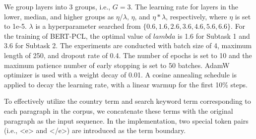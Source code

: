 \documentclass[11pt]{article}
\begin{document}
We group layers into $3$ groups, i.e., $G=3$. 
The learning rate for layers in the lower, median, and higher groups as $\eta / \lambda$, $\eta$, and $\eta * \lambda$, respectively, where $\eta$ is set to 1e-5. $\lambda$ is a hyperparameter searched from $\{0.6, 1.6, 2.6, 3.6, 4.6, 5.6, 6.6\}$. 
For the training of BERT-PCL, the optimal value of $lambda$ is 1.6 for Subtask 1 and 3.6 for Subtask 2.
The experiments are conducted with batch size of 4, maximum length of 250, and dropout rate of 0.4. The number of epochs is set to 10 and the maximum patience number of early stopping is set to 50 batches. 
AdamW optimizer \citep{DBLP:journals/corr/KingmaB14} is used with a weight decay of 0.01.
A cosine annealing schedule \citep{DBLP:conf/iclr/LoshchilovH17} is applied to decay the learning rate, with a linear warmup for the first 10\% steps.

To effectively utilize the country term and search keyword term corresponding to each paragraph in the corpus, we concatenate these terms with the original paragraph as the input sequence. In the implementation, two special token pairs (i.e., <e> and </e>) are introduced as the term boundary.

\begin{table}[t]
\centering
{}
\caption{
Results for the problem of detecting PCL, viewed as a binary classification problem (Subtask 1). 
The results are reported in terms of the precision (P), recall (R) and F1 score of the positive class. 
All compared pre-trained models are fine-tuned on the task dataset.
$^\dagger$ indicates the results on the official ranking.
}
\label{tab:result_1}
\end{table}
\end{document}
